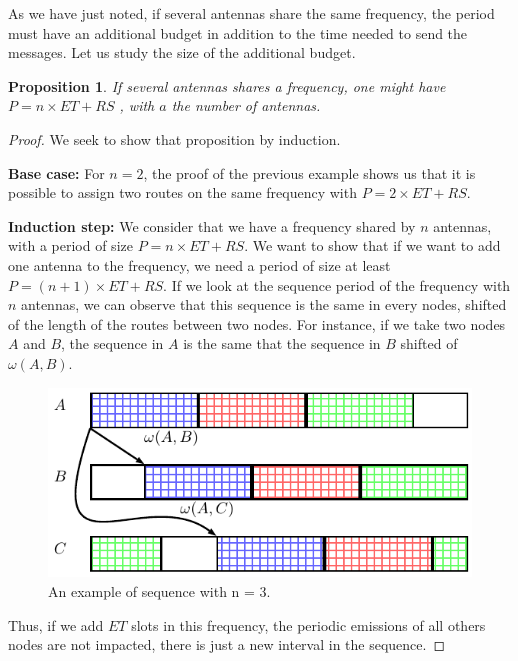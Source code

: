 \documentclass[a4paper,10pt,french,english]{article}
\newtheorem{prop}{Proposition}
\begin{document}
 
 As we have just noted, if several antennas share the same frequency, the period must have an additional budget in addition to the time needed to send the messages. Let us study the size of the additional budget.
 \begin{prop}
 If several antennas shares a frequency, one might have $P = n\times ET + RS$ , with $a$ the number of antennas.
 \end{prop}
 \begin{proof}
 We seek to show that proposition by induction.
 
 {\bf Base case:} For $n = 2$, the proof of the previous example shows us that it is possible to assign two routes on the same frequency with $P = 2\times ET + RS$.
 
 {\bf Induction step:}  We consider that we have a frequency shared by $n$ antennas, with a period of size $P= n\times ET + RS$. We want to show that if we want to add one antenna to the frequency, we need a period of size at least $P = (n+1)\times ET + RS$. If we look at the sequence period of the frequency with $n$ antennas, we can observe that this sequence is the same in every nodes, shifted of the length of the routes between two nodes. For instance, if we take two nodes $A$ and $B$, the sequence in $A$ is the same that the sequence in $B$ shifted of $\omega(A,B)$.
 
   \begin{figure}[h]
\centering
      \includegraphics[scale=0.7]{period1.pdf}
     \caption{An example of sequence with n = 3.}   \label{fig:proofperiod1}
  \end{figure}
   
 Thus, if we add $ET$ slots in this frequency, the periodic emissions of all others nodes are not impacted, there is just a new interval in the sequence.
 

\end{proof}
\end{document}
